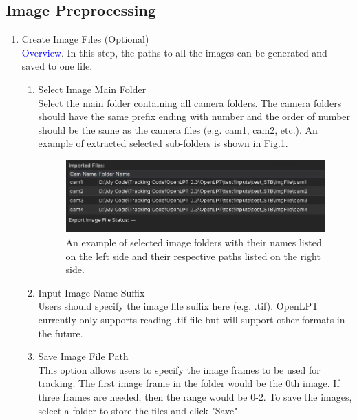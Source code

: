 \documentclass[a4paper,fleqn]{article}
\begin{document}
\begin{enumerate}
\begin{enumerate}
    \end{enumerate}
    
    
\end{enumerate}

\subsection{Image Preprocessing}
\begin{enumerate}
    \item Create Image Files (Optional)\\
    \textcolor{blue}{Overview}. In this step, the paths to all the images can be generated and saved to one file.
    \begin{enumerate}
        \item Select Image Main Folder\\
        Select the main folder containing all camera folders. The camera folders should have the same prefix ending with number and the order of number should be the same as the camera files (e.g. cam1, cam2, etc.). An example of extracted selected sub-folders is shown in Fig.\ref{fig:GUI_imgpre_subfolder}.
        \begin{figure}[h]
            \centering
            \includegraphics[width=\linewidth]{Fig/Screenshot (13).png}
            \caption{An example of selected image folders with their names listed on the left side and their respective paths listed on the right side.}
            \label{fig:GUI_imgpre_subfolder}
        \end{figure}

        \item Input Image Name Suffix\\
        Users should specify the image file suffix here (e.g. .tif). OpenLPT currently only supports reading .tif file but will support other formats in the future.

        \item Save Image File Path\\
        This option allows users to specify the image frames to be used for tracking. The first image frame in the folder would be the 0th image. If three frames are needed, then the range would be 0-2. To save the images, select a folder to store the files and click "Save".
        

\end{enumerate}
\end{enumerate}
\end{document}
